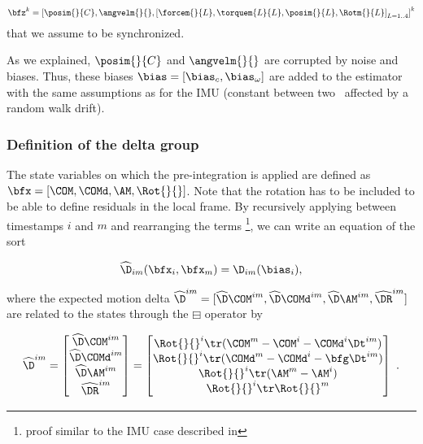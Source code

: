\begin{equation}
    \bfz^k = \left[ \posim{}{C}, \angvelm{}{}, \left[\forcem{}{L}, \torquem{L}{L}, \posim{}{L}, \Rotm{}{L} \right]_{L=1..4}\right]^k
\end{equation}
%
that we assume to be synchronized.

As we explained, $\posim{}{C}$ and $\angvelm{}{}$ are corrupted by noise and biases. Thus, these biases  $\bias = [\bias_c, \bias_{\omega}]$ are added to the estimator
with the same assumptions as for the IMU (constant between two \keyframes\, affected by a random walk drift).


\subsubsection{Definition of the delta group}

The state variables on which the pre-integration is applied are defined as $\bfx=[\COM, \COMd, \AM, \Rot{}{}]$.
Note that the rotation has to be included to be able to define residuals in the local frame.
By recursively applying  between timestamps $i$ and $m$ and rearranging the terms \footnote{proof similar to the IMU case described in 
}, we can write an equation of the sort 

\begin{equation}
    \widehat\D_{im}(\bfx_i, \bfx_m) = \D_{im}(\bias_i),
\end{equation}

where the expected motion delta $\widehat\D^{im} = [\widehat\D\COM^{im}, \widehat\D\COMd^{im}, \widehat\D\AM^{im}, \widehat\DR^{im}]$ are related to the states through the 
$\boxminus$ operator by


\begin{equation}
    \widehat\D^{im} =
    \begin{bmatrix}
        \widehat\D\COM^{im} \\ \widehat\D\COMd^{im} \\ \widehat\D\AM^{im} \\ \widehat\DR^{im}
    \end{bmatrix}
    =
    \begin{bmatrix}
        {\Rot{}{}^i}\tr (\COM^m - \COM^i - \COMd^i \Dt^{im})
        \\
        {\Rot{}{}^i}\tr (\COMd^{m} - \COMd^{i} - \bfg \Dt^{im})
        \\
        {\Rot{}{}^i}\tr (\AM^{m} - \AM^{i})
        \\
        {\Rot{}{}^i}\tr \Rot{}{}^m
    \end{bmatrix}~.
    \label{eq:com_boxminus}
\end{equation}

